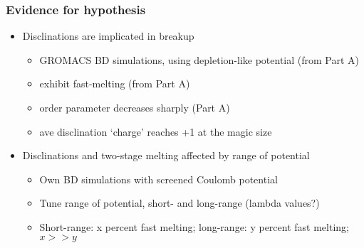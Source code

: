 \documentclass[11pt]{article}
\begin{document}
\subsubsection{Evidence for hypothesis}
\label{sec-3-1-4}
\begin{itemize}

\item Disclinations are implicated in breakup
\label{sec-3-1-4-1}%
\begin{itemize}

\item GROMACS BD simulations, using depletion-like potential (from Part A)\\
\label{sec-3-1-4-1-1}%
\item exhibit fast-melting (from Part A)\\
\label{sec-3-1-4-1-2}%
\item order parameter decreases sharply (Part A)\\
\label{sec-3-1-4-1-3}%
\item ave disclination `charge' reaches +1 at the magic size\\
\label{sec-3-1-4-1-4}%
\end{itemize} %

\item Disclinations and two-stage melting affected by range of potential
\label{sec-3-1-4-2}%
\begin{itemize}

\item Own BD simulations with screened Coulomb potential\\
\label{sec-3-1-4-2-1}%
\item Tune range of potential, short- and long-range (lambda values?)\\
\label{sec-3-1-4-2-2}%
\item Short-range: x percent fast melting; long-range: y percent fast melting; $x>>y$\\
\label{sec-3-1-4-2-3}%
\end{itemize} %
\end{itemize} %
\end{document}
